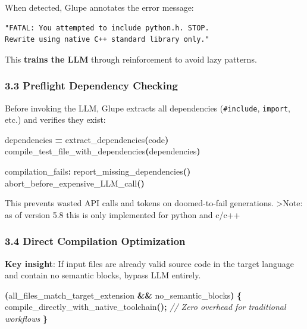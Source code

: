 \documentclass[11pt, a4paper]{article}
\newenvironment{Shaded}{\begin{snugshade}}{\end{snugshade}}
\newcommand{\CommentTok}[1]{\textcolor[rgb]{0.56,0.35,0.01}{\textit{#1}}}
\newcommand{\NormalTok}[1]{#1}
\newcommand{\OperatorTok}[1]{\textcolor[rgb]{0.81,0.36,0.00}{\textbf{#1}}}
\begin{document}
When detected, Glupe annotates the error message:

\begin{verbatim}
"FATAL: You attempted to include python.h. STOP. 
Rewrite using native C++ standard library only."
\end{verbatim}

This \textbf{trains the LLM} through reinforcement to avoid lazy
patterns.

\subsubsection{3.3 Preflight Dependency
Checking}\label{preflight-dependency-checking}

Before invoking the LLM, Glupe extracts all dependencies
(\texttt{\#include}, \texttt{import}, etc.) and verifies they exist:

\begin{Shaded}
\begin{Highlighting}[]
\NormalTok{dependencies }\OperatorTok{=}\NormalTok{ extract\_dependencies}\OperatorTok{(}\NormalTok{code}\OperatorTok{)}
\NormalTok{compile\_test\_file\_with\_dependencies}\OperatorTok{(}\NormalTok{dependencies}\OperatorTok{)}

\NormalTok{ compilation\_fails}\OperatorTok{:}
\NormalTok{    report\_missing\_dependencies}\OperatorTok{()}
\NormalTok{    abort\_before\_expensive\_LLM\_call}\OperatorTok{()}
\end{Highlighting}
\end{Shaded}

This prevents wasted API calls and tokens on doomed-to-fail generations.
\textgreater Note: as of version 5.8 this is only implemented for python
and c/c++

\subsubsection{3.4 Direct Compilation
Optimization}\label{direct-compilation-optimization}

\textbf{Key insight}: If input files are already valid source code in
the target language and contain no semantic blocks, bypass LLM entirely.

\begin{Shaded}
\begin{Highlighting}[]
 \OperatorTok{(}\NormalTok{all\_files\_match\_target\_extension }\OperatorTok{\&\&}\NormalTok{ no\_semantic\_blocks}\OperatorTok{)} \OperatorTok{\{}
\NormalTok{    compile\_directly\_with\_native\_toolchain}\OperatorTok{();}
    \CommentTok{// Zero overhead for traditional workflows}
\OperatorTok{\}}
\end{Highlighting}
\end{Shaded}
\end{document}
